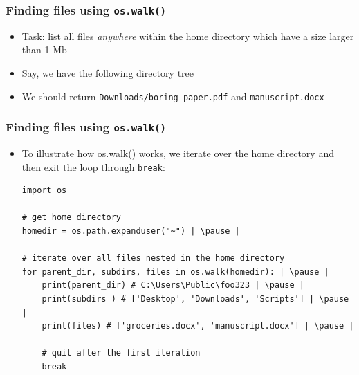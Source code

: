 \documentclass[xcolor=table]{beamer}
\begin{document}

\begin{frame}[fragile]
    \frametitle{Finding files using \texttt{os.walk()}}
    \begin{itemize}
        \item Task: list all files \emph{anywhere} within the home directory which have a size larger than 1 Mb \pause
        \item
    Say, we have the following directory tree
             \pause
        \item We should return \texttt{Downloads/boring\_paper.pdf} and \texttt{manuscript.docx}
        \end{itemize}
\end{frame}


\begin{frame}[fragile]
    \frametitle{Finding files using \texttt{os.walk()}}
    \begin{itemize}
        \item To illustrate how \href{https://docs.python.org/3.7/library/os.html#os.walk}{os.walk()} works, we iterate over the home directory and then exit the loop through \texttt{break}:
\begin{lstlisting}[style=python]
import os 

# get home directory
homedir = os.path.expanduser("~") | \pause |

# iterate over all files nested in the home directory
for parent_dir, subdirs, files in os.walk(homedir): | \pause |
    print(parent_dir) # C:\Users\Public\foo323 | \pause |
    print(subdirs ) # ['Desktop', 'Downloads', 'Scripts'] | \pause |
    print(files) # ['groceries.docx', 'manuscript.docx'] | \pause |

    # quit after the first iteration
    break

\end{lstlisting}
    \end{itemize}
\end{frame}
\end{document}
